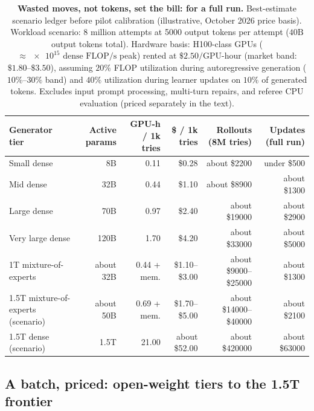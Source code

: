 \begin{table}[t]
  \caption{\textbf{Wasted moves, not tokens, set the bill: \TBD{\$} for a full run.} Best-estimate scenario ledger before pilot calibration (illustrative, October 2026 price basis). Workload scenario: $8\text{ million}$ attempts at \num{5000} output tokens per attempt ($40\text{B}$ output tokens total). Hardware basis: H100-class GPUs ($\approx \num{e15}\text{ dense FLOP/s}$ peak) rented at $\$2.50/\text{GPU-hour}$ (market band: $\$1.80\text{--}\$3.50$), assuming $20\%$ FLOP utilization during autoregressive generation ($10\%\text{--}30\%$ band) and $40\%$ utilization during learner updates on $10\%$ of generated tokens. Excludes input prompt processing, multi-turn repairs, and referee CPU evaluation (priced separately in the text).}
  \label{tab:price}\label{tab:run-priced}\label{tab:cost-scenarios}
  \centering
  \footnotesize
  \begin{tabular}{@{}l r r r r r@{}}
    \toprule
    Generator tier & Active params & {GPU-h / 1k tries} & {\$ / 1k tries} & {Rollouts (8M tries)} & {Updates (full run)} \\
    \midrule
    Small dense & 8B & 0.11 & \$0.28 & about \$\num{2200} & under \$\num{500} \\
    Mid dense & 32B & 0.44 & \$1.10 & about \$\num{8900} & about \$\num{1300} \\
    Large dense & 70B & 0.97 & \$2.40 & about \$\num{19000} & about \$\num{2900} \\
    Very large dense & 120B & 1.70 & \$4.20 & about \$\num{33000} & about \$\num{5000} \\
    1T mixture-of-experts & about 32B & 0.44 + mem. & \$1.10--\$3.00 & about \$\num{9000}--\$\num{25000} & about \$\num{1300} \\
    1.5T mixture-of-experts (scenario) & about 50B & 0.69 + mem. & \$1.70--\$5.00 & about \$\num{14000}--\$\num{40000} & about \$\num{2100} \\
    1.5T dense (scenario) & 1.5T & 21.00 & about \$52.00 & about \$\num{420000} & about \$\num{63000} \\
    \bottomrule
  \end{tabular}
\end{table}

\subsection{A batch, priced: open-weight tiers to the 1.5T frontier}\label{sub:price-batch}\label{subsec:run-priced}

